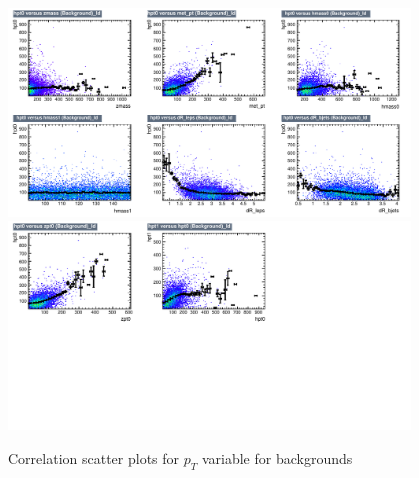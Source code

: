 \begin{figure}[!htb]%
\centering
\includegraphics[width=0.95\textwidth]{figures/CRTT/dataset/plots/correlationscatter_hpt0__Id_c3.pdf}
\includegraphics[width=0.95\textwidth]{figures/CRTT/dataset/plots/correlationscatter_hpt0__Id_c4.pdf}
\caption{ Correlation scatter plots for \HZZ $p_{T}$ variable for backgrounds}%
\label{fig:correlations_CRTT_hpt0_BG}                                                       
\end{figure}


